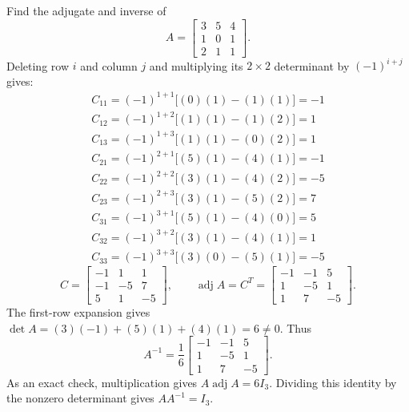 \goal Find the adjugate and inverse of
\[A=\begin{bmatrix}3&5&4\\1&0&1\\2&1&1\end{bmatrix}.\]
Deleting row $i$ and column $j$ and multiplying its $2\times2$ determinant by $(-1)^{i+j}$ gives:
\[\begin{gathered}
C_{11}=(-1)^{1+1}\big[(0)(1)-(1)(1)\big]=-1\\C_{12}=(-1)^{1+2}\big[(1)(1)-(1)(2)\big]=1\\C_{13}=(-1)^{1+3}\big[(1)(1)-(0)(2)\big]=1\\C_{21}=(-1)^{2+1}\big[(5)(1)-(4)(1)\big]=-1\\C_{22}=(-1)^{2+2}\big[(3)(1)-(4)(2)\big]=-5\\C_{23}=(-1)^{2+3}\big[(3)(1)-(5)(2)\big]=7\\C_{31}=(-1)^{3+1}\big[(5)(1)-(4)(0)\big]=5\\C_{32}=(-1)^{3+2}\big[(3)(1)-(4)(1)\big]=1\\C_{33}=(-1)^{3+3}\big[(3)(0)-(5)(1)\big]=-5
\end{gathered}\]
\[C=\begin{bmatrix}-1&1&1\\-1&-5&7\\5&1&-5\end{bmatrix},\qquad\operatorname{adj}A=C^T=\begin{bmatrix}-1&-1&5\\1&-5&1\\1&7&-5\end{bmatrix}.\]
The first-row expansion gives $\det A=(3)(-1) + (5)(1) + (4)(1)=6\ne0$. Thus
\[A^{-1}=\frac{1}{6}\begin{bmatrix}-1&-1&5\\1&-5&1\\1&7&-5\end{bmatrix}.\]
As an exact check, multiplication gives $A\operatorname{adj}A=6I_3$. Dividing this identity by the nonzero determinant gives $AA^{-1}=I_3$.


